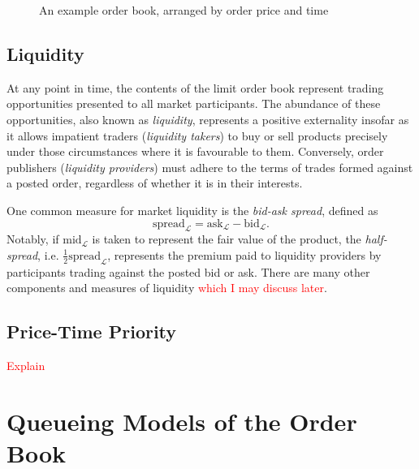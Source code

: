 \documentclass[honours,12pt]{unswthesis}
\numberwithin{equation}{section}
\begin{document}
\begin{figure}[h]
\caption{An example order book, arranged by order price and time}
\end{figure}

\subsection{Liquidity}
At any point in time, the contents of the limit order book represent trading opportunities presented to all market participants. The abundance of these opportunities, also known as \textit{liquidity}, represents a positive externality insofar as it allows impatient traders (\textit{liquidity takers}) to buy or sell products precisely under those circumstances where it is favourable to them. Conversely, order publishers (\textit{liquidity providers}) must adhere to the terms of trades formed against a posted order, regardless of whether it is in their interests.

One common measure for market liquidity is the \textit{bid-ask spread}, defined as
	$$\text{spread}_\mathcal{L} = \text{ask}_\mathcal{L} - \text{bid}_\mathcal{L}.$$
Notably, if $\text{mid}_\mathcal{L}$ is taken to represent the fair value of the product, the \textit{half-spread}, i.e. $\frac{1}{2}\text{spread}_\mathcal{L}$, represents the premium paid to liquidity providers by participants trading against the posted bid or ask. There are many other components and measures of liquidity \textcolor{red}{which I may discuss later}.

\subsection{Price-Time Priority}

\textcolor{red}{Explain}

\section{Queueing Models of the Order Book}
\end{document}
